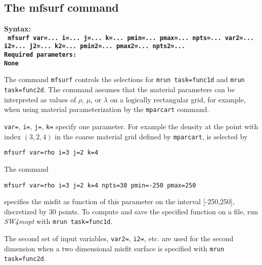 \documentclass[12pt]{report}
\begin{document}
\subsection{The mfsurf command}\label{sec:mfsurf}
\begin{flushleft}\bf
Syntax:\\
\tt
mfsurf var=... i=... j=... k=... pmin=... pmax=... npts=... var2=... i2=... j2=... k2=... pmin2=... pmax2=... npts2=...
\\
\bf Required parameters:\\
\rm
None
\end{flushleft}
The command \verb+mfsurf+ controls the selections for {\tt mrun task=func1d} and {\tt mrun task=func2d}.
The command assumes that the material parameters can be interpreted as values of
$\rho$, $\mu$, or $\lambda$ on a logically rectangular grid, for example, when using material
parameterization by the \verb+mparcart+ command.\par
\verb+var=+, \verb+i=+, \verb+j=+, \verb+k=+ specify one parameter. For example the density at the
point with index $(3,2,4)$ in the coarse material grid defined by \verb+mparcart+, is selected by
\begin{verbatim}
mfsurf var=rho i=3 j=2 k=4
\end{verbatim}
The command 
\begin{verbatim}
mfsurf var=rho i=3 j=2 k=4 npts=30 pmin=-250 pmax=250
\end{verbatim}
specifies the misfit as function of this parameter on the interval [-250,250], discretized by 30 points.
To compute and save the specified function on a file, run \emph{SW4mopt} with \verb+mrun task=func1d+.
\par
The second set of input variables, \verb+var2=+, \verb+i2=+, etc. are used for the second dimension when
a two dimensional misfit surface is specified with \verb+mrun task=func2d+.
\end{document}
